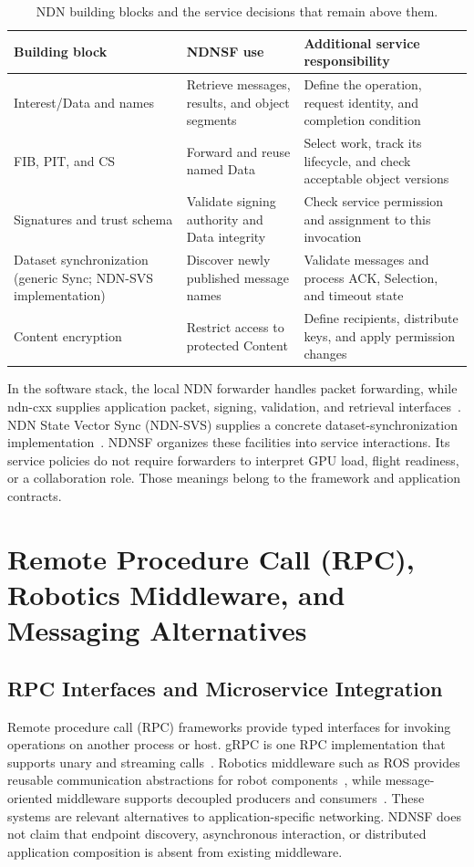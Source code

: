 \begin{table}[htbp]\centering\small
\caption{NDN building blocks and the service decisions that remain above them.}
\label{tab:ndn-runtime-map}
\begin{tabularx}{\textwidth}{p{}XX}
\toprule Building block & NDNSF use & Additional service responsibility\\\midrule
Interest/Data and names & Retrieve messages, results, and object segments & Define the operation, request identity, and completion condition\\\midrule
FIB, PIT, and CS & Forward and reuse named Data & Select work, track its lifecycle, and check acceptable object versions\\\midrule
Signatures and trust schema & Validate signing authority and Data integrity & Check service permission and assignment to this invocation\\\midrule
Dataset synchronization (generic Sync; NDN-SVS implementation) & Discover newly published message names & Validate messages and process ACK, Selection, and timeout state\\\midrule
Content encryption & Restrict access to protected Content & Define recipients, distribute keys, and apply permission changes\\\bottomrule
\end{tabularx}
\end{table}

In the software stack, the local NDN forwarder handles packet forwarding, while ndn-cxx supplies application packet, signing, validation, and retrieval interfaces~\cite{ndn-cxx}. NDN State Vector Sync (NDN-SVS) supplies a concrete dataset-synchronization implementation~\cite{ndnsvs-github}. NDNSF organizes these facilities into service interactions. Its service policies do not require forwarders to interpret GPU load, flight readiness, or a collaboration role. Those meanings belong to the framework and application contracts.

\section{Remote Procedure Call (RPC), Robotics Middleware, and Messaging Alternatives}
\subsection{RPC Interfaces and Microservice Integration}
Remote procedure call (RPC) frameworks provide typed interfaces for invoking operations on another process or host. gRPC is one RPC implementation that supports unary and streaming calls~\cite{grpc}. Robotics middleware such as ROS provides reusable communication abstractions for robot components~\cite{ros,ros2}, while message-oriented middleware supports decoupled producers and consumers~\cite{messagequeue}. These systems are relevant alternatives to application-specific networking. NDNSF does not claim that endpoint discovery, asynchronous interaction, or distributed application composition is absent from existing middleware.

